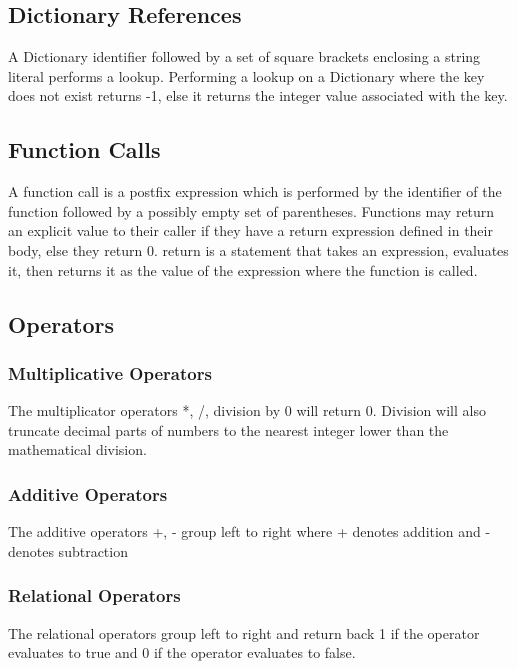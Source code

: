 \documentclass[12pt]{article}
\begin{document}
\subsection{Dictionary References}
A Dictionary identifier followed by a set of square brackets enclosing a string literal performs a lookup. Performing a lookup on a Dictionary where the key does not exist returns -1, else it returns the integer value associated with the key.

\subsection{Function Calls}
A function call is a postfix expression which is performed by the identifier of the function
followed by a possibly empty set of parentheses. Functions may return an explicit value to their caller if they have a return expression defined in their body, else they return 0.  return is a statement that takes an expression, evaluates it, then returns it as the value of the expression where the function is called.

\subsection{Operators}

\subsubsection{Multiplicative Operators}
The multiplicator operators *, /, %
division by 0 will return 0.  Division will also truncate decimal parts of numbers to the nearest integer lower than the mathematical division.

\subsubsection{Additive Operators}
The additive operators +, - group left to right where + denotes addition and - denotes subtraction

\subsubsection{Relational Operators}
The relational operators group left to right and return back 1 if the operator evaluates to true and 0 if the operator evaluates to false. 
 
\end{document}
